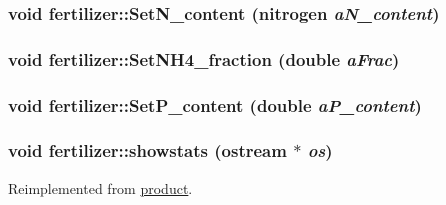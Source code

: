 \hypertarget{classfertilizer_a213ec34de1c23058796926ea2a5eb724}{
\subsubsection[{SetN\_\-content}]{\setlength{\rightskip}{0pt plus 5cm}void fertilizer::SetN\_\-content ({\bf nitrogen} {\em aN\_\-content})}}
\label{classfertilizer_a213ec34de1c23058796926ea2a5eb724}
\hypertarget{classfertilizer_a532d27ade401ee2ee620a6d1fe63f4e7}{
\subsubsection[{SetNH4\_\-fraction}]{\setlength{\rightskip}{0pt plus 5cm}void fertilizer::SetNH4\_\-fraction (double {\em aFrac})}}
\label{classfertilizer_a532d27ade401ee2ee620a6d1fe63f4e7}
\hypertarget{classfertilizer_accf91762ffa698a82bcd2579e13d8ac2}{
\subsubsection[{SetP\_\-content}]{\setlength{\rightskip}{0pt plus 5cm}void fertilizer::SetP\_\-content (double {\em aP\_\-content})}}
\label{classfertilizer_accf91762ffa698a82bcd2579e13d8ac2}
\hypertarget{classfertilizer_a8b3b753b7d29e5a3e22d493e368e5f42}{
\subsubsection[{showstats}]{\setlength{\rightskip}{0pt plus 5cm}void fertilizer::showstats (ostream $\ast$ {\em os})}}
\label{classfertilizer_a8b3b753b7d29e5a3e22d493e368e5f42}


Reimplemented from \hyperlink{classproduct_a1151ea416ab90047f8d087be57a6d7b1}{product}.

